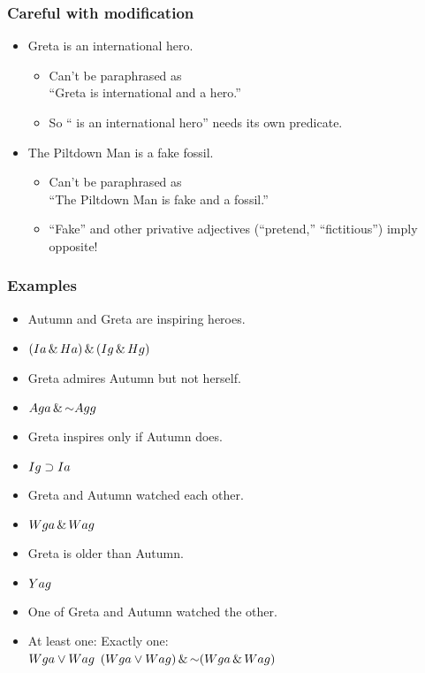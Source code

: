 \begin{frame}
\frametitle{Careful with modification}

\begin{itemize}[<+->]
\item Greta is an international hero.
\begin{itemize}
  \item Can't be paraphrased as\\
  ``Greta is international and a hero.''
  \item So ``\gap{} is an international hero'' needs its own
  predicate.
\end{itemize}
\item The Piltdown Man is a fake fossil.
\begin{itemize}[<+->]
  \item Can't be paraphrased as\\
  ``The Piltdown Man is fake and a fossil.''
  \item ``Fake'' and other privative adjectives (``pretend,''
  ``fictitious'') imply opposite!
\end{itemize}
\end{itemize}
\end{frame}

\begin{frame}
\frametitle{Examples}

\begin{itemize}[<+->]
  \item Autumn and Greta are inspiring heroes.\\
  \item[] \alert{$(Ia \,\&\, Ha) \,\&\, (Ig \,\&\, Hg)$}
  \item Greta admires Autumn but not herself.\\
  \item[] \alert{$A\qr{g}{a} \eand \enot A\qr{g}{g}$}
  \item Greta inspires only if Autumn does.
  \item[] \alert{$Ig \supset Ia$}
  \item Greta and Autumn watched each other.
  \item[] \alert{$Wga \,\&\, Wag$} 
  \item Greta is older than Autumn.
  \item[] \alert{$Yag$}  
  \item One of Greta and Autumn watched the other.
  \item[] At least one: \hfill Exactly one:\\
  \alert{$Wga \vee Wag$} \hfill \alert{$(W\qr{g}{a} \eor W\qr{a}{g}) \eand \enot(W\qr{g}{a} \eand W\qr{a}{g})$}
\end{itemize}
\end{frame}

